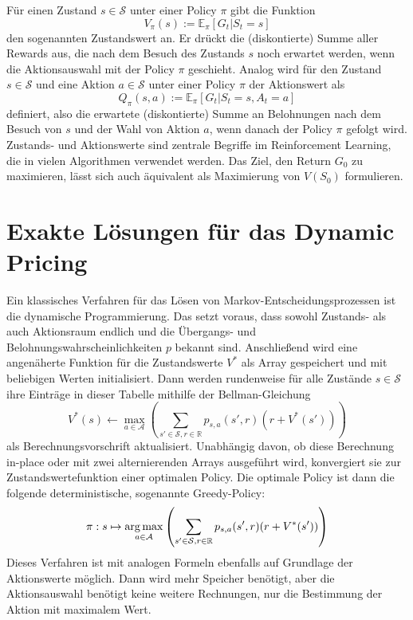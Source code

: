 Für einen Zustand $s \in \mathcal{S}$ unter einer Policy $\pi$ gibt die Funktion
\begin{equation}
	V_\pi(s) := \mathbb{E}_\pi\left[G_t | S_t = s\right]
\end{equation}
den sogenannten Zustandswert an.
Er drückt die (diskontierte) Summe aller Rewards aus, die nach dem Besuch des Zustands $s$ noch erwartet werden, wenn die Aktionsauswahl mit der Policy $\pi$ geschieht.
Analog wird für den Zustand $s \in \mathcal{S}$ und eine Aktion $a \in \mathcal{S}$ unter einer Policy $\pi$ der Aktionswert als
\begin{equation}
	Q_\pi(s, a) := \mathbb{E}_\pi\left[G_t | S_t = s, A_t = a\right]
\end{equation}
definiert, also die erwartete (diskontierte) Summe an Belohnungen nach dem Besuch von $s$ und der Wahl von Aktion $a$, wenn danach der Policy $\pi$ gefolgt wird.
Zustands- und Aktionswerte sind zentrale Begriffe im Reinforcement Learning, die in vielen Algorithmen verwendet werden.
Das Ziel, den Return $G_0$ zu maximieren, lässt sich auch äquivalent als Maximierung von $V(S_0)$ formulieren.

\section{Exakte Lösungen für das Dynamic Pricing}
\label{section:dp}
Ein klassisches Verfahren für das Lösen von Markov-Entscheidungsprozessen ist die dynamische Programmierung.
Das setzt voraus, dass sowohl Zustands- als auch Aktionsraum endlich und die Übergangs- und Belohnungswahrscheinlichkeiten $p$ bekannt sind.
Anschließend wird eine angenäherte Funktion für die Zustandswerte $V^*$ als Array gespeichert und mit beliebigen Werten initialisiert.
Dann werden rundenweise für alle Zustände $s\in\mathcal{S}$ ihre Einträge in dieser Tabelle mithilfe der Bellman-Gleichung
\begin{equation}
	V^*(s) \leftarrow \max_{a\in\mathcal{A}}{\left(\sum_{s'\in\mathcal{S}, r \in \mathbb{R}}{p_{s, a}\left(s', r\right) \left(r + V^*(s')\right)}\right)}
\end{equation}
als Berechnungsvorschrift aktualisiert.
Unabhängig davon, ob diese Berechnung in-place oder mit zwei alternierenden Arrays ausgeführt wird, konvergiert sie zur Zustandswertefunktion einer optimalen Policy. \cite{Sutton1998}
Die optimale Policy ist dann die folgende deterministische, sogenannte Greedy-Policy:
\begin{equation}
	\pi: s \mapsto \argmax_{a\in\mathcal{A}}{\left(\sum_{s'\in\mathcal{S}, r \in \mathbb{R}}{p_{s, a}\left(s', r\right) \left(r + V^*(s')\right)}\right)}
\end{equation}
Dieses Verfahren ist mit analogen Formeln ebenfalls auf Grundlage der Aktionswerte möglich.
Dann wird mehr Speicher benötigt, aber die Aktionsauswahl benötigt keine weitere Rechnungen, nur die Bestimmung der Aktion mit maximalem Wert.

